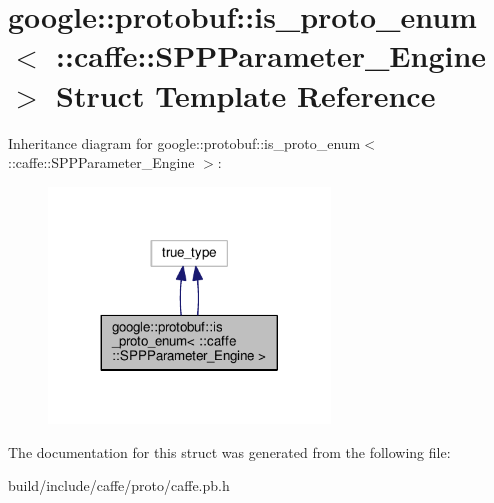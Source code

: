 \hypertarget{structgoogle_1_1protobuf_1_1is__proto__enum_3_01_1_1caffe_1_1_s_p_p_parameter___engine_01_4}{}\section{google\+:\+:protobuf\+:\+:is\+\_\+proto\+\_\+enum$<$ \+:\+:caffe\+:\+:S\+P\+P\+Parameter\+\_\+\+Engine $>$ Struct Template Reference}
\label{structgoogle_1_1protobuf_1_1is__proto__enum_3_01_1_1caffe_1_1_s_p_p_parameter___engine_01_4}


Inheritance diagram for google\+:\+:protobuf\+:\+:is\+\_\+proto\+\_\+enum$<$ \+:\+:caffe\+:\+:S\+P\+P\+Parameter\+\_\+\+Engine $>$\+:
\nopagebreak
\begin{figure}[H]
\begin{center}
\leavevmode
\includegraphics[width=212pt]{structgoogle_1_1protobuf_1_1is__proto__enum_3_01_1_1caffe_1_1_s_p_p_parameter___engine_01_4__inherit__graph}
\end{center}
\end{figure}


The documentation for this struct was generated from the following file\+:\begin{DoxyCompactItemize}
\item 
build/include/caffe/proto/caffe.\+pb.\+h\end{DoxyCompactItemize}
